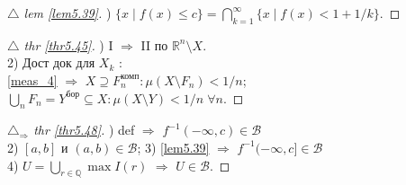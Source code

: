 \begin{minipage}[t]{0.43\textwidth}
\begin{proof}[
{$\triangle$} 
lem \eqref{lem5.39}]

\phantom{42}

) $\{x \mid f(x) \leq c \} = 
\bigcap\limits_{k=1}^{\infty} \{x \mid f(x) < 1 + 1/k\}$.
\end{proof}

\begin{proof}[
{$\triangle$} 
thr \eqref{thr5.45}]

\phantom{42}

) I $\Rightarrow$ II по $\mathbb{R}^n \setminus X$. \\
2) Дост док для $X_k$ : \\
\eqref{meas_4} $\Rightarrow$ $X \supseteq F_n^{\text{комп}} \colon 
\mu(X \setminus F_n) < 1/n$; \\
$\bigcup_n F_n = Y^{\text{бор}} \subseteq X \colon \mu(X \setminus Y) < 1/n \; \forall n$.
\end{proof}

\begin{proof}[
{$\triangle_{\Rightarrow}$} 
thr \eqref{thr5.48}]

\phantom{42}

) def $\Rightarrow$ $f^{-1}(-\infty, c) \in \mathcal{B}$ \\
2) $[a, b]$ и $(a, b) \in \mathcal{B}$; 3) \eqref{lem5.39} $\Rightarrow$ $f^{-1}(-\infty, c] \in \mathcal{B}$ \\
4) $U = \bigcup_{r \in \mathbb{Q}} \max I(r)$ $\Rightarrow$ $U \in \mathcal{B}$.
\end{proof}


\end{minipage}  